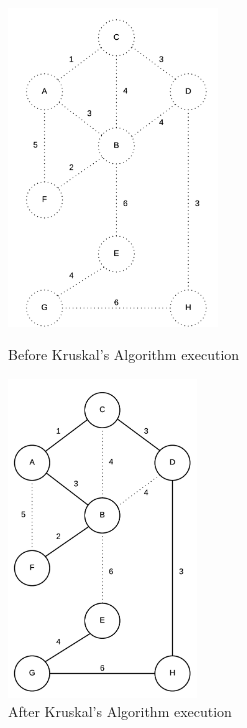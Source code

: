 \documentclass[12pt,letterpaper]{article}
\begin{document}
\begin{figure}[h]
\centering
\includegraphics[width=5.56cm]{mst1}
\caption{Before Kruskal's Algorithm execution}
\includegraphics[width=5cm]{mst2}
\caption{After Kruskal's Algorithm execution}
\label{KruskalFin}
\end{figure}
\FloatBarrier
\end{document}
